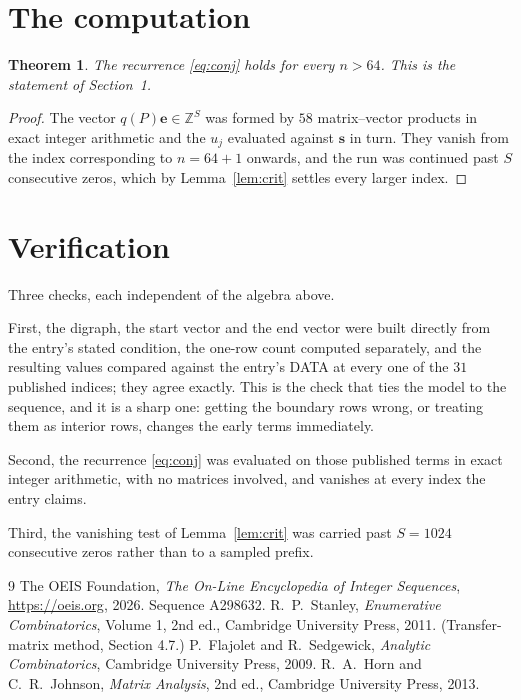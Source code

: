 \documentclass[11pt,a4paper]{article}
\theoremstyle{plain}
\newtheorem{theorem}{Theorem}
\theoremstyle{definition}
\begin{document}
\section{The computation}

\begin{theorem}
The recurrence \eqref{eq:conj} holds for every $n>64$. This is the statement of
Section~1.
\end{theorem}

\begin{proof}
The vector $q(P)\mathbf{e}\in\mathbb{Z}^{S}$ was formed by $58$ matrix--vector
products in exact integer arithmetic and the $u_j$ evaluated against $\mathbf{s}$ in turn.
They vanish from the index corresponding to $n=64+1$ onwards, and the run was continued
past $S$ consecutive zeros, which by Lemma~\ref{lem:crit} settles every larger index.
\end{proof}

\section{Verification}

Three checks, each independent of the algebra above.

First, the digraph, the start vector and the end vector were built directly from the
entry's stated condition, the one-row count computed separately, and the resulting values
compared against the entry's DATA at every one of the $31$ published indices; they
agree exactly. This is the check that ties the model to the sequence, and it is a sharp one:
getting the boundary rows wrong, or treating them as interior rows, changes the early terms
immediately.

Second, the recurrence \eqref{eq:conj} was evaluated on those published terms in exact
integer arithmetic, with no matrices involved, and vanishes at every index the entry claims.

Third, the vanishing test of Lemma~\ref{lem:crit} was carried past $S=1024$ consecutive
zeros rather than to a sampled prefix.

\begin{thebibliography}{9}
 The OEIS Foundation, \emph{The On-Line Encyclopedia of Integer
Sequences}, \url{https://oeis.org}, 2026. Sequence A298632.
 R.~P.~Stanley, \emph{Enumerative Combinatorics}, Volume 1, 2nd ed.,
Cambridge University Press, 2011. (Transfer-matrix method, Section 4.7.)
 P.~Flajolet and R.~Sedgewick, \emph{Analytic Combinatorics}, Cambridge
University Press, 2009.
 R.~A.~Horn and C.~R.~Johnson, \emph{Matrix Analysis}, 2nd ed., Cambridge
University Press, 2013.
\end{thebibliography}
\end{document}
